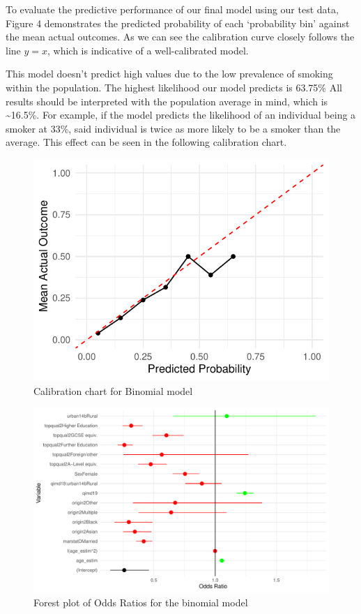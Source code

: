 \documentclass[
  11pt,
  twocolumn]{article}
\begin{document}
To evaluate the predictive performance of our final model using our test
data, Figure 4 demonstrates the predicted probability of each
`probability bin' against the mean actual outcomes. As we can see the
calibration curve closely follows the line \(y = x\), which is
indicative of a well-calibrated model.

This model doesn't predict high values due to the low prevalence of
smoking within the population. The highest likelihood our model predicts
is 63.75\% All results should be interpreted with the population average
in mind, which is \textasciitilde16.5\%. For example, if the model
predicts the likelihood of an individual being a smoker at 33\%, said
individual is twice as more likely to be a smoker than the average. This
effect can be seen in the following calibration chart.

\begin{figure}[H]

{\centering \includegraphics{Coursework_files/figure-latex/output-calibration-chart-1} 

}

\caption{Calibration chart for Binomial model}\label{fig:output-calibration-chart}
\end{figure}
\begin{figure}[H]
\includegraphics{Coursework_files/figure-latex/output-forest-plot-1} \caption{Forest plot of Odds Ratios for the binomial model}\label{fig:output-forest-plot}
\end{figure}
\end{document}

